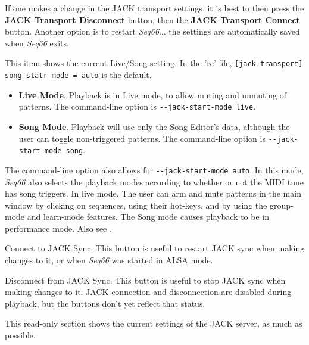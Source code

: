    If one makes a change in the JACK transport settings, it is best to
   then press the \textbf{JACK Transport Disconnect} button, then the
   \textbf{JACK Transport Connect} button.
   Another option is to restart
   \textsl{Seq66}... the settings are automatically saved when
   \textsl{Seq66} exits.

   This item shows the current Live/Song setting.
   In the 'rc' file, 
   \texttt{[jack-transport] song-statr-mode = auto}
   is the default.
    
   \begin{itemize}
      \item \textbf{Live Mode}.
         Playback is in Live mode, to allow muting and
         unmuting of patterns.
         The command-line option is \texttt{-{}-jack-start-mode live}.
      \item \textbf{Song Mode}.
         Playback will use only the Song Editor's data, although
         the user can toggle non-triggered patterns.
         The command-line option is \texttt{-{}-jack-start-mode song}.
   \end{itemize}

   The command-line option also allows for
   \texttt{-{}-jack-start-mode auto}.
   In this mode,
   \textsl{Seq66} also selects the playback modes
   according to whether or not the MIDI tune has song triggers.
   In live mode.  The user can arm and mute
   patterns in the main window by clicking on sequences, using their hot-keys,
   and by using the group-mode and learn-mode features.
   The Song mode causes playback to be in performance mode.
   Also see .

   Connect to JACK Sync.
   This button is useful to restart JACK sync when making changes to it,
   or when \textsl{Seq66} was started in ALSA mode.

   Disconnect from JACK Sync.
   This button is useful to stop JACK sync when making changes to it.
   JACK connection and disconnection are disabled during playback, but the
   buttons don't yet reflect that status.

   This read-only section shows the current settings of the JACK
   server, as much as possible.

